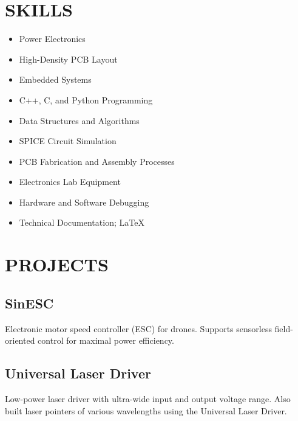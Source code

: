 

	\maketitle
	
	\section*{SKILLS}
	\begin{minipage}{0.5\textwidth}
		\centering
		\begin{itemize}
			\setlength \itemsep{0.1em}
			\item Power Electronics
			\item High-Density PCB Layout
			\item Embedded Systems
			\item C++, C, and Python Programming
			\item Data Structures and Algorithms
		\end{itemize}
	\end{minipage}%
	\begin{minipage}{0.5\textwidth}
		\centering
		\begin{itemize}
			\setlength \itemsep{0.1em}
			\item SPICE Circuit Simulation
			\item PCB Fabrication and Assembly Processes
			\item Electronics Lab Equipment
			\item Hardware and Software Debugging
			\item Technical Documentation; \LaTeX
		\end{itemize}
	\end{minipage}
	
	\section*{PROJECTS}
	\subsection{SinESC}
	Electronic motor speed controller (ESC) for drones. Supports sensorless field-oriented control for maximal power efficiency.
	\subsection{Universal Laser Driver}
	Low-power laser driver with ultra-wide input and output voltage range. Also built laser pointers of various wavelengths using the Universal Laser Driver.
